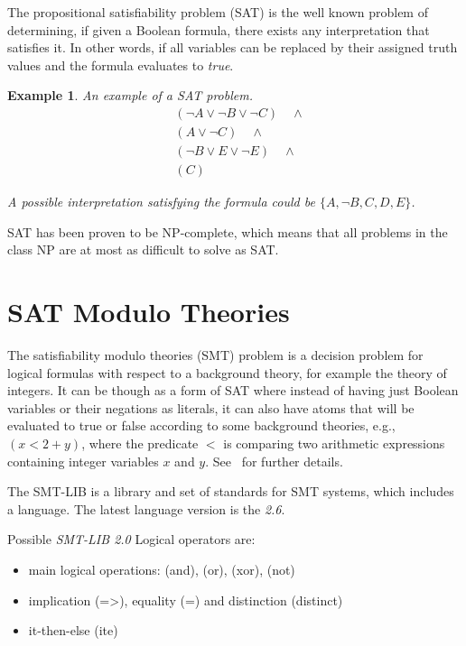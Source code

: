 \documentclass{report}
\theoremstyle{plain}
\newtheorem{example}{Example}[section]
\begin{document}
The propositional satisfiability problem (SAT) is the well known problem of determining, if given a Boolean formula, there exists any interpretation that satisfies it. In other words, if all variables can be replaced by their assigned truth values and the formula evaluates to \textit{true}.

\vspace{1\baselineskip}

\begin{example} An example of a  SAT problem.
\begin{align*}
& (\lnot A \vee \lnot B \vee \lnot C) \quad \wedge \\
& (A \vee \lnot C) \quad \wedge \\
& (\lnot B \vee E \vee \lnot E) \quad \wedge \\
& (C)
\end{align*}

A possible interpretation satisfying the formula could be $\{A, \lnot B, C, D , E\}$.
\end{example}

SAT has been proven to be NP-complete, which means that all problems in the class NP are at most as difficult to solve as SAT.

\section{SAT Modulo Theories}
The satisfiability modulo theories (SMT) problem is a decision problem for logical formulas with respect to a background theory, for example the theory of integers. It can be though as a form of SAT where instead of having just Boolean variables or their negations as literals, it can also have atoms that will be evaluated to true or false according to some background theories, e.g., $(x<2+y)$, where the predicate $<$ is comparing two arithmetic expressions containing integer variables $x$ and $y$. See~\cite{smt} for further details.

The SMT-LIB is a library and set of standards for SMT systems, which includes a language. The latest language version is the \emph{2.6}.

Possible \emph{SMT-LIB 2.0} Logical operators are:
\begin{itemize}
    \item main logical operations: (and), (or), (xor), (not)
    \item implication (=\textgreater), equality (=) and distinction (distinct)
    \item it-then-else (ite)
\end{itemize}
\end{document}
